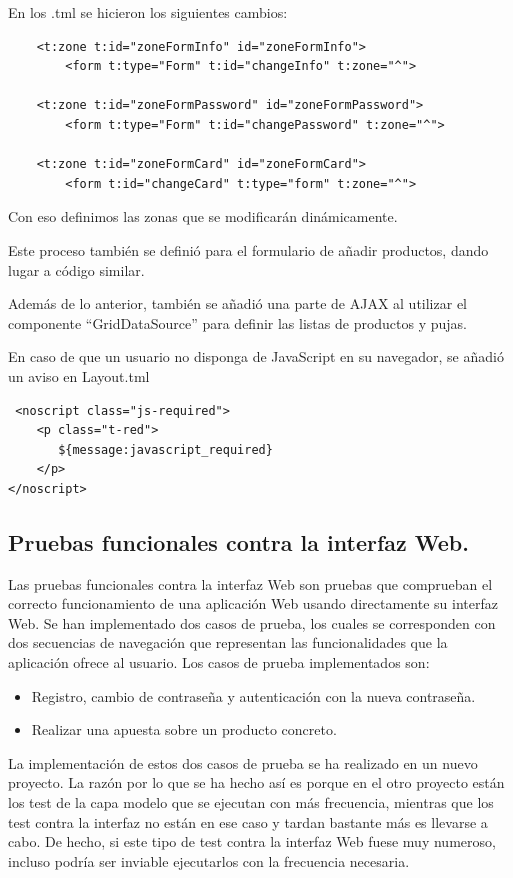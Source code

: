 \documentclass[12pt,a4paper,twoside,spanish]{article}      %
\begin{document}
En los .tml se hicieron los siguientes cambios:
\begin{verbatim}
	<t:zone t:id="zoneFormInfo" id="zoneFormInfo">
		<form t:type="Form" t:id="changeInfo" t:zone="^">
		
	<t:zone t:id="zoneFormPassword" id="zoneFormPassword">
		<form t:type="Form" t:id="changePassword" t:zone="^">
	
	<t:zone t:id="zoneFormCard" id="zoneFormCard">
		<form t:id="changeCard" t:type="form" t:zone="^">
\end{verbatim}

Con eso definimos las zonas que se modificarán dinámicamente.

Este proceso también se definió para el formulario de añadir productos, dando lugar a código similar.

Además de lo anterior, también se añadió una parte de AJAX al utilizar el componente ``GridDataSource'' para definir las listas de productos y pujas.

En caso de que un usuario no disponga de JavaScript en su navegador, se añadió un aviso en Layout.tml
\begin{verbatim}
 <noscript class="js-required">
	<p class="t-red">
       ${message:javascript_required}
    </p>
</noscript>
\end{verbatim}




\subsection{Pruebas funcionales contra la interfaz Web.}

	Las pruebas funcionales contra la interfaz Web son pruebas que comprueban el correcto funcionamiento de una aplicación Web usando directamente su interfaz Web. Se han implementado dos casos de prueba, los cuales se corresponden con dos secuencias de navegación que representan las funcionalidades que la aplicación ofrece al usuario. Los casos de prueba implementados son:
\begin{itemize}
	\item Registro, cambio de contraseña y autenticación con la nueva contraseña.
	\item Realizar una apuesta sobre un producto concreto.
\end{itemize}

	La implementación de estos dos casos de prueba se ha realizado en un nuevo proyecto. La razón por lo que se ha hecho así es porque en el otro proyecto están los test de la capa modelo que se ejecutan con más frecuencia, mientras que los test contra la interfaz no están en ese caso y tardan bastante más es llevarse a cabo. De hecho, si este tipo de test contra la interfaz Web fuese muy numeroso, incluso podría ser inviable ejecutarlos con la frecuencia necesaria.
	
\end{document}
